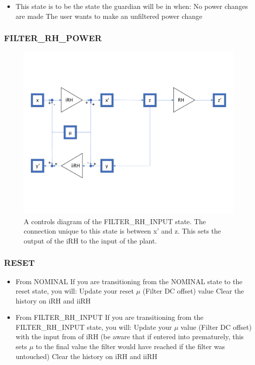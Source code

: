 \documentclass{article}
\begin{document}
\begin{itemize}
\item This state is to be the state the guardian will be in when: 
\subitem No power changes are made
\subitem The user wants to make an unfiltered power change
\end{itemize}

\subsubsection{FILTER\_RH\_POWER}


\begin{figure}[H]
    \centering
    \includegraphics[width=1\textwidth]{FILTER_RH_INPUT_DIAGRAM.pdf}
    \caption{A controls diagram of the FILTER\_RH\_INPUT state. The connection unique to this state is between x' and z. This sets the output of the iRH to the input of the plant. }
\end{figure}
\subsubsection{RESET}
\begin{itemize}
\item From NOMINAL
	\subitem If you are transitioning from the NOMINAL state to the reset state, you will:
		\subsubitem Update your reset $\mu$ (Filter DC offset) value 
		\subsubitem Clear the history on iRH and iiRH
\subitem

\item From FILTER\_RH\_INPUT
	\subitem If you are transitioning from the FILTER\_RH\_INPUT state, you will: 
		\subsubitem Update your $\mu$ value (Filter DC offset) with the input from of iRH (be aware that if entered into prematurely, this sets $\mu$ to the final value the filter would have reached if the filter was untouched)
		\subsubitem Clear the history on iRH and iiRH
\end{itemize}
\end{document}
